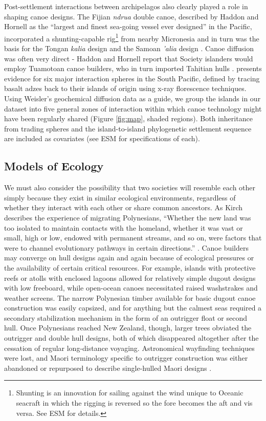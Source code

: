 \documentclass[11pt]{article}
\begin{document}
Post-settlement interactions between archipelagos also clearly played a role in shaping canoe designs. The Fijian \textit{ndrua} double canoe, described by Haddon and Hornell as the ``largest and finest sea-going vessel ever designed'' in the Pacific, incorporated a shunting-capable rig\footnote{Shunting is an innovation for sailing against the wind unique to Oceanic seacraft in which the rigging is reversed so the fore becomes the aft and vis versa. See ESM for details.} from nearby Micronesia and in turn was the basis for the Tongan \textit{kalia} design and the Samoan \textit{'alia} design \citep[pg.~319]{HaddonHornell1936}. Canoe diffusion was often very direct - Haddon and Hornell report that Society islanders would employ Tuamotoan canoe builders, who in turn imported Tahitian hulls \citep[pg.~74,79]{HaddonHornell1936}. \cite{Weisler1998} presents evidence for six major interaction spheres in the South Pacific, defined by tracing basalt adzes back to their islands of origin using x-ray florescence techniques. Using Weisler's geochemical diffusion data as a guide, we group the islands in our dataset into five general zones of interaction within which canoe technology might have been regularly shared (Figure \ref{fig:map}, shaded regions). Both inheritance from trading spheres and the island-to-island phylogenetic settlement sequence are included as covariates (see ESM for specifications of each).


\subsection{Models of Ecology}

We must also consider the possibility that two societies will resemble each other simply because they exist in similar ecological environments, regardless of whether they interact with each other or share common ancestors. As Kirch describes the experience of migrating Polynesians, ``Whether the new land was too isolated to maintain contacts with the homeland, whether it was vast or small, high or low, endowed with permanent streams, and so on, were factors that were to channel evolutionary pathways in certain directions.'' \citep{Kirch1984evolution}. Canoe builders may converge on hull designs again and again because of ecological pressures or the availability of certain critical resources. For example, islands with protective reefs or atolls with enclosed lagoons allowed for relatively simple dugout designs with low freeboard, while open-ocean canoes necessitated raised washstrakes and weather screens. The narrow Polynesian timber available for basic dugout canoe construction was easily capsized, and for anything but the calmest seas required a secondary stabilization mechanism in the form of an outrigger float or second hull. Once Polynesians reached New Zealand, though, larger trees obviated the outrigger and double hull designs, both of which disappeared altogether after the cessation of regular long-distance voyaging. Astronomical wayfinding techniques were lost, and Maori terminology specific to outrigger construction was either abandoned or repurposed to describe single-hulled Maori designs \citep{Biggs2006}.
\end{document}
